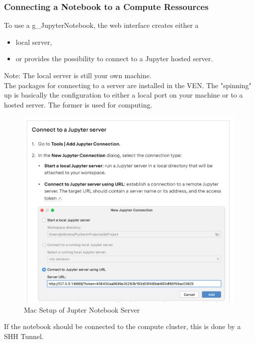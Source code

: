 \subsubsection{Connecting a Notebook to a Compute Ressources}
To use a \gls{g_JupyterNotebook}, the web interface creates either a
\begin{itemize}
	\item local server,
	\item or provides the possibility to connect to a Jupyter hosted server.
\end{itemize}
Note: The local server is still your own machine.\\

The packages for connecting to a server are installed in the \gls{VEN}. The "spinning" up is basically the configuration to either a local port on your machine or to a hosted server. The former is used for computing.

\begin{figure}[H]
	\centering
	\includegraphics[scale = 0.3]{attachment/chapter_AML/Scc008}
	\caption{Mac Setup of Jupter Notebook Server}
\end{figure}

If the notebook should be connected to the compute cluster, this is done by a SHH Tunnel.

